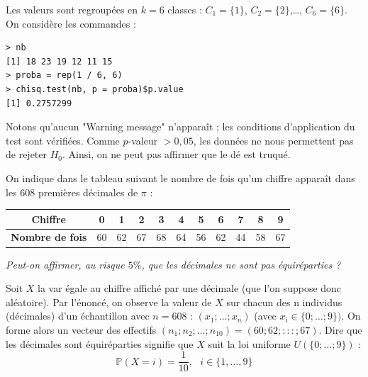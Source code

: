 Les valeurs sont regroupées en $k = 6$ classes : $C_{1} = \{1\}$, $C_{2} = \{2\}$,\dots, $C_{6} = \{6\}$.\newline
On considère les commandes :
\begin{lstlisting}[language=html]
> nb
[1] 18 23 19 12 11 15
> proba = rep(1 / 6, 6)
> chisq.test(nb, p = proba)$p.value
[1] 0.2757299
\end{lstlisting}
Notons qu'aucun "Warning message" n'apparaît ; les conditions d'application du test sont vérifiées.\newline
Comme $p$-valeur $> 0,05$, les données ne nous permettent pas de rejeter $H_{0}$. Ainsi, on ne peut pas affirmer que le dé est truqué.



On indique dans le tableau suivant le nombre de fois qu'un chiffre apparaît dans les $608$ premières décimales de $\pi$ : 
\begin{center}
\begin{tabular}{|c|c|c|c|c|c|c|c|c|c|c|}
\hline
\textbf{Chiffre}        & 0  & 1  & 2  & 3  & 4  & 5  & 6  & 7  & 8  & 9  \\ \hline
\textbf{Nombre de fois} & 60 & 62 & 67 & 68 & 64 & 56 & 62 & 44 & 58 & 67 \\ \hline
\end{tabular}
\end{center}
\textit{Peut-on affirmer, au risque $5\%$, que les décimales ne sont pas équiréparties ?}



Soit $X$ la var égale au chiffre affiché par une décimale (que l'on suppose donc aléatoire).\newline
Par l'énoncé, on observe la valeur de $X$ sur chacun des n individus (décimales) d'un échantillon avec $n = 608$ : $(x_{1}; \dots ; x_{n})$ (avec $x_{i} \in \{0; \dots ; 9 \})$. On forme alors un vecteur des effectifs $(n_{1}; n_{2}; \dots ; n_{10}) = (60; 62; : : : ; 67)$. Dire que les décimales sont équiréparties signifie que $X$ suit la loi uniforme $\mathit{U}(\{0; \dots ; 9\})$ :
$$\mathbb{P}(X=i) = \frac{1}{10}, \textrm{ } i \in \{1,\dots, 9\}$$

